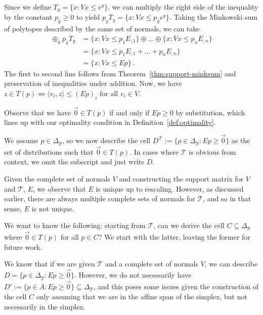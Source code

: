 \documentclass[anon]{colt2020} %
\newcommand{\simplex}{\Delta_\Y}
\newcommand{\T}{\mathcal{T}}
\newcommand{\Y}{\mathcal{Y}}
\newcommand{\inprod}[2]{\langle #1, #2 \rangle}%
\begin{document}
Since we define $T_y = \{x : Vx \leq e^y\}$, we can multiply the right side of the inequality by the constant $p_y \geq  0$ to yield $p_y T_y = \{x : Vx \leq p_y e^y\}$.
Taking the Minkowski sum of polytopes described by the same set of normals, we can take 
\begin{align*}
\oplus_y p_y T_y &= \{x : Vx \leq p_1 E_{;1}\} \oplus \ldots \oplus \{x : Vx \leq p_n E_{;n}\} \\
&= \{x : Vx \leq p_1 E_{;1} + \ldots + p_n E_{;n}\}\\
&= \{x : Vx \leq E p\}~.~
\end{align*}
The first to second line follows from Theorem~\ref{thm:support-minksum} and preservation of inequalities under addition.
Now, we have $z \in T(p) \iff \inprod{v_i}{z} \leq (Ep)_i$ for all $v_i \in V$.

Observe that we have $\vec 0 \in T(p)$ if and only if $E p \geq 0$ by substitution, which lines up with our optimality condition in Definition~\ref{def:optimality}.  

We assume $p \in \simplex$, so we now describe the cell $D^\T := \{p \in \simplex : Ep \geq \vec 0\}$ as the set of distributions such that $\vec 0 \in T(p)$.
In cases where $\T$ is obvious from context, we omit the subscript and just write $D$.

Given the complete set of normals $V$ and constructing the support matrix for $V$ and $\T$, $E$, we observe that $E$ is unique up to rescaling.
However, as discussed earlier, there are always multiple complete sets of normals for $\T$, and so in that sense, $E$ is not unique.


We want to know the following: starting from $\T$, can we derive the cell $C \subseteq \simplex$ where $\vec 0 \in T(p)$ for all $p \in C$?
We start with the latter, leaving the former for future work.

We know that if we are given $\T$ and a complete set of normals $V$, we can describe $D = \{p \in \simplex : Ep \geq \vec 0\}$.
However, we do not necessarily have $D' := \{p \in A : Ep \geq \vec 0\} \subseteq \simplex$, and this poses some issues given the construction of the cell $C$ only assuming that we are in the affine span of the simplex, but not necessarily in the simplex.
\end{document}
